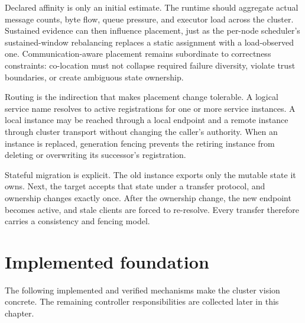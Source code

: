 Declared affinity is only an initial estimate. The runtime should aggregate
actual message counts, byte flow, queue pressure, and executor load across
the cluster. Sustained evidence can then influence placement, just as the
per-node scheduler's sustained-window rebalancing replaces a static
assignment with a load-observed one. Communication-aware placement remains
subordinate to correctness constraints: co-location must not collapse
required failure diversity, violate trust boundaries, or create ambiguous
state ownership.

Routing is the indirection that makes placement change tolerable. A logical
service name resolves to active registrations for one or more service instances.
A local instance may be reached through a local endpoint and a remote instance
through cluster transport without changing the caller's authority. When an
instance is replaced, generation fencing prevents the retiring instance from deleting or
overwriting its successor's registration.

Stateful migration is explicit. The old instance exports only the
mutable state it owns. Next, the target accepts that state under a transfer
protocol, and ownership changes exactly once. After the ownership change, the new endpoint becomes active,
and stale clients are forced to re-resolve. Every transfer therefore carries a
consistency and fencing model.

\section{Implemented foundation}

The following implemented and verified mechanisms make the cluster vision
concrete. The remaining controller responsibilities are collected later in
this chapter.

